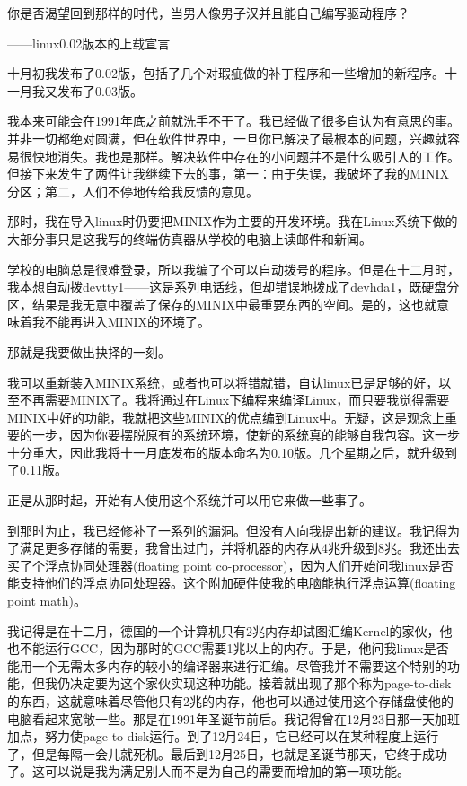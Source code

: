  

你是否渴望回到那样的时代，当男人像男子汉并且能自己编写驱动程序？

——linux0.02版本的上载宣言

 

十月初我发布了0.02版，包括了几个对瑕疵做的补丁程序和一些增加的新程序。十一月我又发布了0.03版。

我本来可能会在1991年底之前就洗手不干了。我已经做了很多自认为有意思的事。并非一切都绝对圆满，但在软件世界中，一旦你已解决了最根本的问题，兴趣就容易很快地消失。我也是那样。解决软件中存在的小问题并不是什么吸引人的工作。但接下来发生了两件让我继续下去的事，第一：由于失误，我破坏了我的MINIX分区；第二，人们不停地传给我反馈的意见。

那时，我在导入linux时仍要把MINIX作为主要的开发环境。我在Linux系统下做的大部分事只是这我写的终端仿真器从学校的电脑上读邮件和新闻。

学校的电脑总是很难登录，所以我编了个可以自动拨号的程序。但是在十二月时，我本想自动拨devtty1——这是系列电话线，但却错误地拨成了devhda1，既硬盘分区，结果是我无意中覆盖了保存的MINIX中最重要东西的空间。是的，这也就意味着我不能再进入MINIX的环境了。

那就是我要做出抉择的一刻。

我可以重新装入MINIX系统，或者也可以将错就错，自认linux已是足够的好，以至不再需要MINIX了。我将通过在Linux下编程来编译Linux，而只要我觉得需要MINIX中好的功能，我就把这些MINIX的优点编到Linux中。无疑，这是观念上重要的一步，因为你要摆脱原有的系统环境，使新的系统真的能够自我包容。这一步十分重大，因此我将十一月底发布的版本命名为0.10版。几个星期之后，就升级到了0.11版。

正是从那时起，开始有人使用这个系统并可以用它来做一些事了。

到那时为止，我已经修补了一系列的漏洞。但没有人向我提出新的建议。我记得为了满足更多存储的需要，我曾出过门，并将机器的内存从4兆升级到8兆。我还出去买了个浮点协同处理器(floating point co-processor)，因为人们开始问我linux是否能支持他们的浮点协同处理器。这个附加硬件使我的电脑能执行浮点运算(floating point math)。

我记得是在十二月，德国的一个计算机只有2兆内存却试图汇编Kernel的家伙，他也不能运行GCC，因为那时的GCC需要1兆以上的内存。于是，他问我linux是否能用一个无需太多内存的较小的编译器来进行汇编。尽管我并不需要这个特别的功能，但我仍决定要为这个家伙实现这种功能。接着就出现了那个称为page-to-disk的东西，这就意味着尽管他只有2兆的内存，他也可以通过使用这个存储盘使他的电脑看起来宽敞一些。那是在1991年圣诞节前后。我记得曾在12月23日那一天加班加点，努力使page-to-disk运行。到了12月24日，它已经可以在某种程度上运行了，但是每隔一会儿就死机。最后到12月25日，也就是圣诞节那天，它终于成功了。这可以说是我为满足别人而不是为自己的需要而增加的第一项功能。

